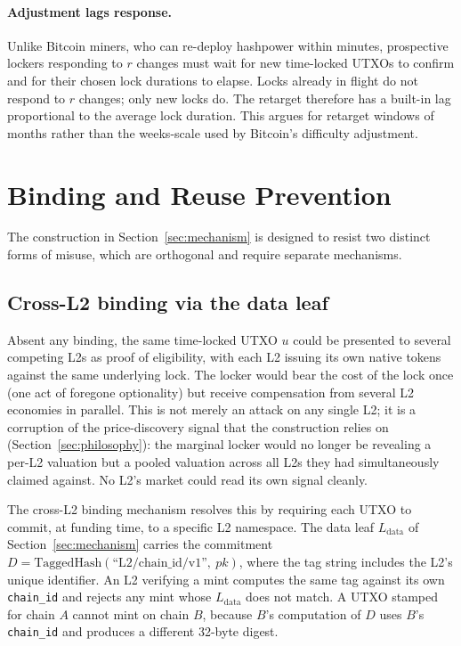 \documentclass[11pt,a4paper]{article}
\begin{document}
\paragraph{Adjustment lags response.} Unlike Bitcoin miners, who can re-deploy hashpower within minutes, prospective lockers responding to $r$ changes must wait for new time-locked UTXOs to confirm and for their chosen lock durations to elapse. Locks already in flight do not respond to $r$ changes; only new locks do. The retarget therefore has a built-in lag proportional to the average lock duration. This argues for retarget windows of months rather than the weeks-scale used by Bitcoin's difficulty adjustment.

\section{Binding and Reuse Prevention}
\label{sec:binding}

The construction in Section~\ref{sec:mechanism} is designed to resist two distinct forms of misuse, which are orthogonal and require separate mechanisms.

\subsection{Cross-L2 binding via the data leaf}

Absent any binding, the same time-locked UTXO $u$ could be presented to several competing L2s as proof of eligibility, with each L2 issuing its own native tokens against the same underlying lock. The locker would bear the cost of the lock once (one act of foregone optionality) but receive compensation from several L2 economies in parallel. This is not merely an attack on any single L2; it is a corruption of the price-discovery signal that the construction relies on (Section~\ref{sec:philosophy}): the marginal locker would no longer be revealing a per-L2 valuation but a pooled valuation across all L2s they had simultaneously claimed against. No L2's market could read its own signal cleanly.

The cross-L2 binding mechanism resolves this by requiring each UTXO to commit, at funding time, to a specific L2 namespace. The data leaf $L_{\mathrm{data}}$ of Section~\ref{sec:mechanism} carries the commitment $D = \mathrm{TaggedHash}(\text{``L2/chain\_id/v1''},\ pk)$, where the tag string includes the L2's unique identifier. An L2 verifying a mint computes the same tag against its own \texttt{chain\_id} and rejects any mint whose $L_{\mathrm{data}}$ does not match. A UTXO stamped for chain $A$ cannot mint on chain $B$, because $B$'s computation of $D$ uses $B$'s \texttt{chain\_id} and produces a different 32-byte digest.
\end{document}
